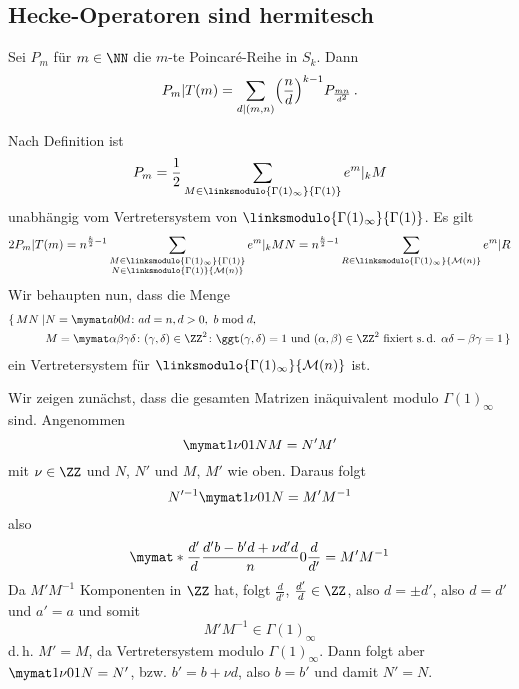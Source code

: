 \subsection{Hecke-Operatoren sind hermitesch}

\begin{satz}
	Sei $P_m$ für $m \in \NN$ die $m$-te Poincaré-Reihe in $S_k$.
	Dann
	\[
		P_m | T(m) = \sum_{d | (m,n)} \Bigl( \frac{n}{d} \Bigr)^{k-1} P_{\frac{mn}{d^2}}
		\,.
	\]
\end{satz}
\begin{bewe}
	Nach Definition ist
	\[
		P_m = \frac{1}{2} \sum_{M\in \linksmodulo{\Gamma(1)_\infty}{\Gamma(1)}} e^m |_k M
	\]
	unabhängig vom Vertretersystem von $\linksmodulo{\Gamma(1)_\infty}{\Gamma(1)}$.
	Es gilt
	\[
		2 P_m | T(m) = n^{\frac{k}{2}-1} \sum_{\substack{M \in \linksmodulo{\Gamma(1)_\infty}{\Gamma(1)}\\ N \in \linksmodulo{\Gamma(1)}{\mathcal{M}(n)}}} e^m|_k MN
		= n^{\frac{k}{2}-1} \sum_{R \in \linksmodulo{\Gamma(1)_\infty}{\mathcal{M}(n)}} e^m|R
	\]
	Wir behaupten nun, dass die Menge 
	\begin{equation*}
	\begin{split}
		\{\,MN \mid &N = \mymat ab0d\colon ad=n, d>0,\ b \bmod d, \\ &M = \mymat \alpha\beta\gamma\delta\colon (\gamma, \delta) \in \ZZ^2\colon \ggt(\gamma, \delta) = 1 \text{ und } (\alpha, \beta) \in \ZZ^2 \text{ fixiert s.\,d. } \alpha\delta - \beta\gamma = 1\,\}
	\end{split}
	\end{equation*}
	ein Vertretersystem für $\linksmodulo{\Gamma(1)_\infty}{\mathcal{M}(n)}$ ist.
	
	Wir zeigen zunächst, dass die gesamten Matrizen inäquivalent modulo $\Gamma(1)_\infty$ sind.
	Angenommen
	\[
		\mymat 1\nu01 NM = N'M'
	\]
	mit $\nu \in \ZZ$ und $N$, $N'$ und $M$, $M'$ wie oben.
	Daraus folgt
	\[
		N'^{-1} \mymat 1\nu01 N = M'M^{-1}
	\]
	also
	\[
		\mymat*{\frac{d'}{d}}{\frac{d'b-b'd+\nu d'd}{n}}{0}{\frac{d}{d'}}
		= M' M^{-1}
	\]
	Da $M'M^{-1}$ Komponenten in $\ZZ$ hat, folgt $\frac{d}{d'}$, $\frac{d'}{d} \in \ZZ$, also $d = \pm d'$, also $d = d'$ und $a' = a$ und somit 
	\[
		M'M^{-1} \in \Gamma(1)_\infty
	\]
	d.\,h. $M' = M$, da Vertretersystem modulo $\Gamma(1)_\infty$.
	Dann folgt aber $\mymat 1\nu01 N = N'$, bzw. $b' = b + \nu d$, also $b = b'$ und damit $N' = N$.
\end{bewe}